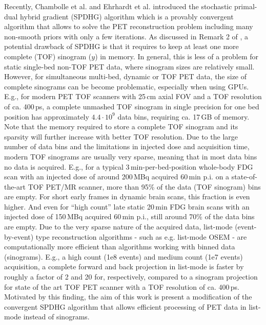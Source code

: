 \documentclass{IEEEtran}
\begin{document}
Recently, Chambolle et al. \cite{Chambolle2018} and  Ehrhardt et al. \cite{Ehrhardt2019} introduced 
the stochastic primal-dual hybrid gradient (SPDHG) algorithm which is a provably convergent algorithm
that allows to solve the PET reconstruction problem including many non-smooth priors with
only a few iterations.
As discussed in Remark 2 of \cite{Ehrhardt2019}, a potential drawback of SPDHG is that it requires
to keep at least one more complete (TOF) sinogram ($y$) in memory. 
In general, this is less of a problem for static single-bed non-TOF PET data, where sinogram sizes
are relatively small.
However, for simultaneous multi-bed, dynamic or TOF PET data, the size of complete sinograms
can be become problematic, especially when using GPUs.
E.g., for modern PET TOF scanners with 25\,cm axial FOV and a TOF resolution of ca. 400\,ps, 
a complete unmashed TOF sinogram in single precision for one bed position 
has approximately $4.4\cdot10^9$ data bins, requiring ca. 17\,GB of memory.
Note that the memory required to store a complete TOF sinogram and its sparsity will further 
increase with better TOF resolution.
Due to the large number of data bins and the limitations in injected dose and acquisition time,
modern TOF sinograms are usually very sparse, meaning that in most data bins no data is
acquired.
E.g., for a typical 3\,min-per-bed-position whole-body FDG scan with an injected dose 
of around 200\,MBq acquired 60\,min p.i. on a state-of-the-art TOF PET/MR scanner, 
more than 95\% of the data (TOF sinogram) bins are empty.
For short early frames in dynamic brain scans, this fraction is even higher.
And even for ``high count'' late static 20\,min FDG brain scans with an injected dose of 150\,MBq
acquired 60\,min p.i., still around 70\% of the data bins are empty.
Due to the very sparse nature of the acquired data, list-mode (event-by-event) type
reconstruction algorithms - such as e.g. list-mode OSEM - are computationally more efficient
than algorithms working with binned data (sinograms).
E.g., a high count (1e8 events) and medium count (1e7 events) acquisition, 
a complete forward and back projection in list-mode is faster by roughly a factor of 2 and 20 for,
respectively, compared to a sinogram projection for state of the art TOF PET scanner 
with a TOF resolution of ca. 400\,ps.
Motivated by this finding, the aim of this work is present a modification of the convergent 
SPDHG algorithm that allows efficient processing of PET data in list-mode instead of sinograms.
\end{document}
